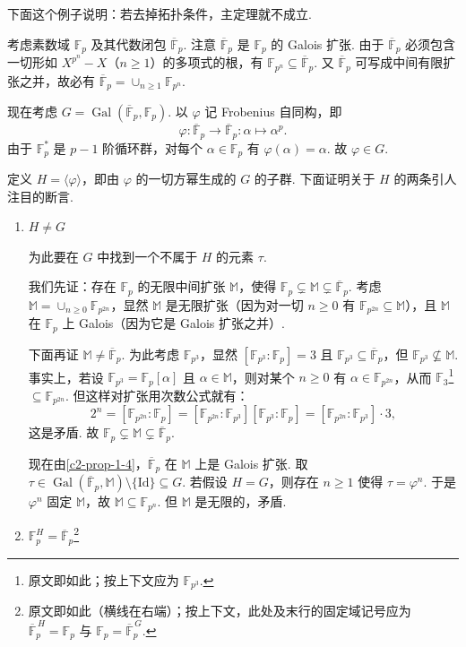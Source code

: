 下面这个例子说明：若去掉拓扑条件，主定理就不成立.

\begin{example}\label{c2-ex-3-1}
考虑素数域 $\mathbb{F}_p$ 及其代数闭包 $\overline{\mathbb{F}}_p$. 注意 $\overline{\mathbb{F}}_p$ 是 $\mathbb{F}_p$ 的 Galois 扩张. 由于 $\overline{\mathbb{F}}_p$ 必须包含一切形如 $X^{p^{n}}-X$（$n\geq 1$）的多项式的根，有 $\mathbb{F}_{p^{n}}\subseteq\overline{\mathbb{F}}_p$. 又 $\overline{\mathbb{F}}_p$ 可写成中间有限扩张之并，故必有 $\overline{\mathbb{F}}_p=\cup_{n\geq 1}\mathbb{F}_{p^{n}}$.

现在考虑 $G=\operatorname{Gal}(\overline{\mathbb{F}}_p,\mathbb{F}_p)$. 以 $\varphi$ 记 Frobenius 自同构，即
\[
\varphi:\overline{\mathbb{F}}_p\to\overline{\mathbb{F}}_p:\alpha\mapsto\alpha^{p}.
\]
由于 $\mathbb{F}_p^{*}$ 是 $p-1$ 阶循环群，对每个 $\alpha\in\mathbb{F}_p$ 有 $\varphi(\alpha)=\alpha$. 故 $\varphi\in G$.

定义 $H=\langle\varphi\rangle$，即由 $\varphi$ 的一切方幂生成的 $G$ 的子群. 下面证明关于 $H$ 的两条引人注目的断言.
\begin{enumerate}
    \item $H\neq G$

    为此要在 $G$ 中找到一个不属于 $H$ 的元素 $\tau$.

    我们先证：存在 $\mathbb{F}_p$ 的无限中间扩张 $\mathbb{M}$，使得 $\mathbb{F}_p\subsetneq\mathbb{M}\subsetneq\overline{\mathbb{F}}_p$. 考虑 $\mathbb{M}=\cup_{n\geq 0}\mathbb{F}_{p^{2n}}$，显然 $\mathbb{M}$ 是无限扩张（因为对一切 $n\geq 0$ 有 $\mathbb{F}_{p^{2n}}\subseteq\mathbb{M}$），且 $\mathbb{M}$ 在 $\mathbb{F}_p$ 上 Galois（因为它是 Galois 扩张之并）.

    下面再证 $\mathbb{M}\neq\overline{\mathbb{F}}_p$. 为此考虑 $\mathbb{F}_{p^{3}}$，显然 $[\mathbb{F}_{p^{3}}:\mathbb{F}_p]=3$ 且 $\mathbb{F}_{p^{3}}\subseteq\overline{\mathbb{F}}_p$，但 $\mathbb{F}_{p^{3}}\nsubseteq\mathbb{M}$. 事实上，若设 $\mathbb{F}_{p^{3}}=\mathbb{F}_p[\alpha]$ 且 $\alpha\in\mathbb{M}$，则对某个 $n\geq 0$ 有 $\alpha\in\mathbb{F}_{p^{2n}}$，从而 $\mathbb{F}_3$\footnote{原文即如此；按上下文应为 $\mathbb{F}_{p^{3}}$.}$\subseteq\mathbb{F}_{p^{2n}}$. 但这样对扩张用次数公式就有：
    \[
    2^{n}=[\mathbb{F}_{p^{2n}}:\mathbb{F}_p]=[\mathbb{F}_{p^{2n}}:\mathbb{F}_{p^{3}}][\mathbb{F}_{p^{3}}:\mathbb{F}_p]=[\mathbb{F}_{p^{2n}}:\mathbb{F}_{p^{3}}]\cdot 3,
    \]
    这是矛盾. 故 $\mathbb{F}_p\subsetneq\mathbb{M}\subsetneq\overline{\mathbb{F}}_p$.

    现在由\autoref{c2-prop-1-4}，$\overline{\mathbb{F}}_p$ 在 $\mathbb{M}$ 上是 Galois 扩张. 取 $\tau\in\operatorname{Gal}(\overline{\mathbb{F}}_p,\mathbb{M})\setminus\{\mathrm{Id}\}\subseteq G$. 若假设 $H=G$，则存在 $n\geq 1$ 使得 $\tau=\varphi^{n}$. 于是 $\varphi^{n}$ 固定 $\mathbb{M}$，故 $\mathbb{M}\subseteq\mathbb{F}_{p^{n}}$. 但 $\mathbb{M}$ 是无限的，矛盾.
    \item $\mathbb{F}_p^{H}=\overline{\mathbb{F}}_p$\footnote{原文即如此（横线在右端）；按上下文，此处及末行的固定域记号应为 $\overline{\mathbb{F}}_p^{\,H}=\mathbb{F}_p$ 与 $\mathbb{F}_p=\overline{\mathbb{F}}_p^{\,G}$.}


\end{enumerate}
\end{example}

